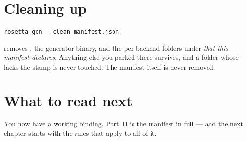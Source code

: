 \section{Cleaning up}

\begin{lstlisting}[style=sh]
rosetta_gen --clean manifest.json
\end{lstlisting}

removes , the generator binary, and the per-backend folders under
 \emph{that this manifest declares}. Anything else you parked
there survives, and a folder whose  lacks the
 stamp is never touched. The manifest itself is
never removed.

\section{What to read next}

You now have a working binding. Part~II is the manifest in full --- and the
next chapter starts with the rules that apply to all of it.
